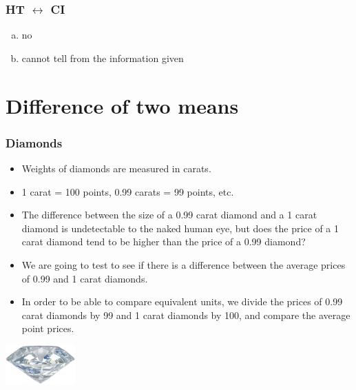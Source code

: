 \documentclass[notes,11pt, aspectratio=169]{beamer}
\begin{document}

\begin{frame}
\frametitle{HT $\leftrightarrow$ CI}


\begin{enumerate}[(a)]
\item no
\item cannot tell from the information given
\end{enumerate}


\end{frame}


\section{Difference of two means}


\begin{frame}
\frametitle{Diamonds}

\begin{itemize}

\item Weights of diamonds are measured in carats. 

\item 1 carat = 100 points, 0.99 carats = 99 points, etc.

\item The difference between the size of a 0.99 carat diamond and a 1 carat diamond is undetectable to the naked human eye, but does the price of a 1 carat diamond tend to be higher than the price of a 0.99 diamond?

\item We are going to test to see if there is a difference between the average prices of 0.99 and 1 carat diamonds.

\item In order to be able to compare equivalent units, we divide the prices of 0.99 carat diamonds by 99 and 1 carat diamonds by 100, and compare the average point prices.

\end{itemize}

\hfill \includegraphics[width=0.2\textwidth]{graphs/diamond}

\end{frame}
\end{document}

